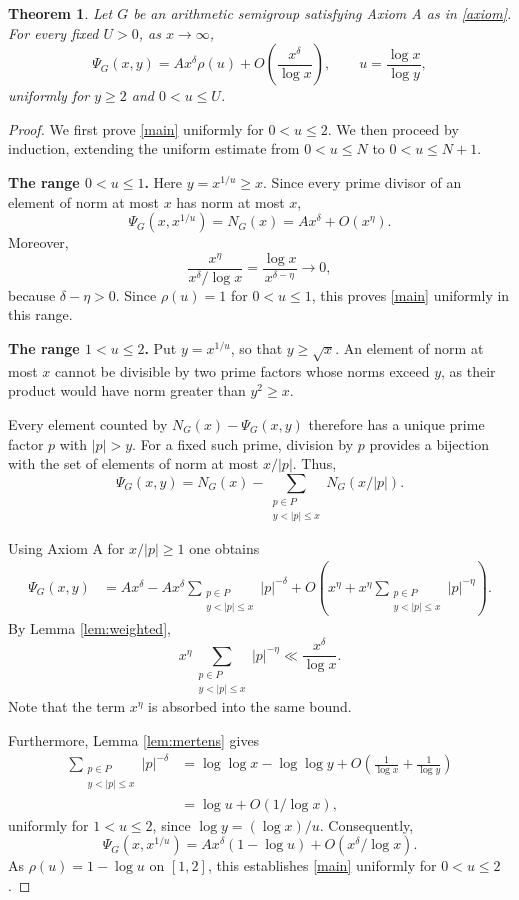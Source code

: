 \documentclass[a4paper]{amsart}
\newtheorem{theorem}{Theorem}[section]
\begin{document}
\begin{theorem}\label{thm:main}
Let $G$ be an arithmetic semigroup satisfying Axiom A
as in \eqref{axiom}. For every fixed $U>0$, as $x\to\infty$,
\begin{equation}\label{main}
\Psi_G(x,y)
=
Ax^\delta\rho(u)
+O\!\left(\frac{x^\delta}{\log x}\right),
\qquad
u=\frac{\log x}{\log y},
\end{equation}
uniformly for $y\ge2$ and $0<u\le U$.
\end{theorem}

\begin{proof}
We first prove \eqref{main} uniformly for $0<u\le2$.
We then proceed by induction, extending the uniform
estimate from $0<u\le N$ to $0<u\le N+1$.

\smallskip
\noindent\textbf{The range $0<u\le1$.}
Here $y=x^{1/u}\ge x$. Since every prime divisor of an
element of norm at most $x$ has norm at most $x$,
\[
\Psi_G(x,x^{1/u})=N_G(x)=Ax^\delta+O(x^\eta).
\]
Moreover,
\[
\frac{x^\eta}{x^\delta/\log x}
=
\frac{\log x}{x^{\delta-\eta}}
\longrightarrow0,
\]
because $\delta-\eta>0$. Since $\rho(u)=1$ for
$0<u\le1$, this proves \eqref{main} uniformly in this range.

\smallskip
\noindent\textbf{The range $1<u\le2$.}
Put $y=x^{1/u}$, so that $y\ge\sqrt{x}$.
An element of norm at most $x$ cannot be divisible by two prime
factors whose norms exceed $y$, as
their product would have norm greater than $y^2\ge x$.

Every element counted by $N_G(x)-\Psi_G(x,y)$ therefore
has a unique prime factor $p$ with $|p|>y$.
For a fixed such prime, division by $p$ provides a
bijection with the set of elements of norm at most $x/|p|$. Thus,
\[
\Psi_G(x,y)
=
N_G(x)
-\sum_{\substack{p\in P\\y<|p|\le x}}N_G(x/|p|).
\]

Using Axiom A for $x/|p|\ge1$ one obtains
\begin{align*}
\Psi_G(x,y)
&=
Ax^\delta
-Ax^\delta
\sum_{\substack{p\in P\\y<|p|\le x}}|p|^{-\delta}+
O\!\left(
x^\eta+
x^\eta
\sum_{\substack{p\in P\\y<|p|\le x}}|p|^{-\eta}
\right).
\end{align*}
By Lemma \ref{lem:weighted},
\[
x^\eta
\sum_{\substack{p\in P\\y<|p|\le x}}|p|^{-\eta}
\ll\frac{x^\delta}{\log x}.
\]
Note that the term $x^\eta$ is absorbed into the same bound.

Furthermore, Lemma \ref{lem:mertens} gives
\begin{align*}
\sum_{\substack{p\in P\\y<|p|\le x}}|p|^{-\delta}
&=
\log\log x-\log\log y
+O\!\left(\frac1{\log x}+\frac1{\log y}\right)\\
&=
\log u+O(1/\log x),
\end{align*}
uniformly for $1<u\le2$, since $\log y=(\log x)/u$.
Consequently,
\[
\Psi_G(x,x^{1/u})
=
Ax^\delta(1-\log u)
+O(x^\delta/\log x).
\]
As $\rho(u)=1-\log u$ on $[1,2]$, this establishes
\eqref{main} uniformly for $0<u\le2$.


\end{proof}
\end{document}
